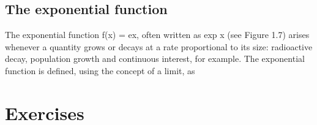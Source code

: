 \subsection{The exponential function}
The exponential function f(x) = ex, often written as exp x (see Figure 1.7) arises whenever a quantity grows or decays at a rate proportional to its size: radioactive decay, population growth and continuous interest, for example. The exponential function is defined, using the concept of a limit, as

\section{Exercises}
\begin{ExerciseList}
\end{ExerciseList}
